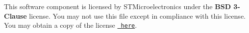 This software component is licensed by STMicroelectronics under the {\bfseries{BSD 3-\/Clause}} license. You may not use this file except in compliance with this license. You may obtain a copy of the license \href{https://opensource.org/licenses/BSD-3-Clause}{\texttt{ here}}. 